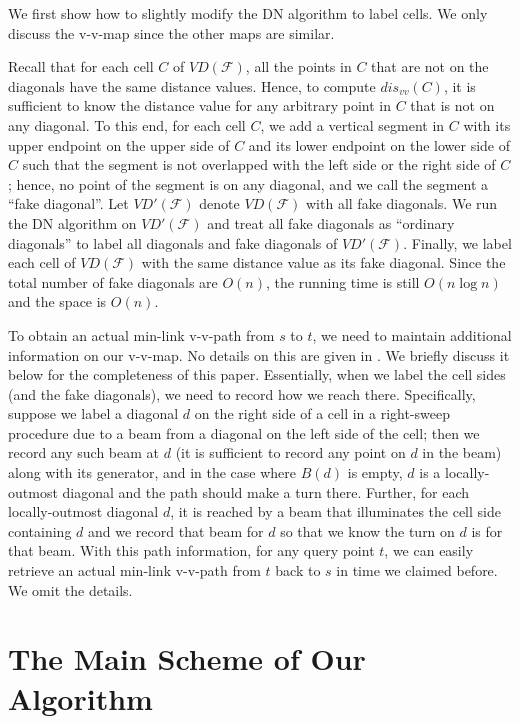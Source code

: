 \documentclass[english,runningheads,11pt]{llncs-revised}
\def\calF{\mathcal{F}}
\newcommand{\vtd}{\mbox{$V\!D$}}
\begin{document}
We first show how to slightly modify the DN algorithm to label cells.
We only discuss the v-v-map since the other maps are similar.


Recall that for each cell $C$ of $\vtd(\calF)$, all the points
in $C$ that are not on the diagonals have the same distance values.
Hence, to compute $dis_{vv}(C)$, it is sufficient to know the distance
value for any arbitrary point in $C$ that is not on any diagonal. To this end,
for each cell $C$, we add a
vertical segment in $C$ with its upper endpoint on the upper side of
$C$ and its lower endpoint on the lower side of $C$ such that the
segment is not overlapped with the left side or the right side of $C$;
hence, no point of the segment is on any diagonal, and
we call the segment a ``fake diagonal''. Let $\vtd'(\calF)$ denote
$\vtd(\calF)$ with all fake diagonals.
We run the DN algorithm on $\vtd'(\calF)$ and treat all fake diagonals
as ``ordinary diagonals'' to label all diagonals and fake diagonals of
$\vtd'(\calF)$. Finally, we label each cell of
$\vtd(\calF)$ with the same distance value as its fake diagonal.
Since the total number of fake diagonals are $O(n)$, the running time is still
$O(n\log n)$ and the space is $O(n)$.

To obtain an actual min-link v-v-path from $s$ to $t$, we need to
maintain additional information on our v-v-map. No details
on this are given in \cite{ref:DasGe91}.
We briefly discuss it below for the completeness
of this paper. Essentially, when we
label the cell sides (and the fake diagonals), we need to record how
we reach there. Specifically, suppose we label a diagonal $d$ on the
right side of a cell in a right-sweep procedure due
to a beam from a diagonal on the left side of the cell; then we record any such
beam at $d$ (it is sufficient to record any
point on $d$ in the beam) along with its
generator, and in the case where $B(d)$ is empty,
$d$ is a locally-outmost diagonal and the path should make a turn
there. Further, for each locally-outmost diagonal $d$, it is reached by a beam that illuminates the
cell side containing $d$ and we record that beam for $d$ so that we know the turn on $d$ is for that beam.
With this path information, for any query point $t$,
we can easily retrieve an actual
min-link v-v-path from $t$ back to $s$ in time we claimed before. We omit the
details.


\section{The Main Scheme of Our Algorithm}
\label{sec:mainscheme}
\end{document}
